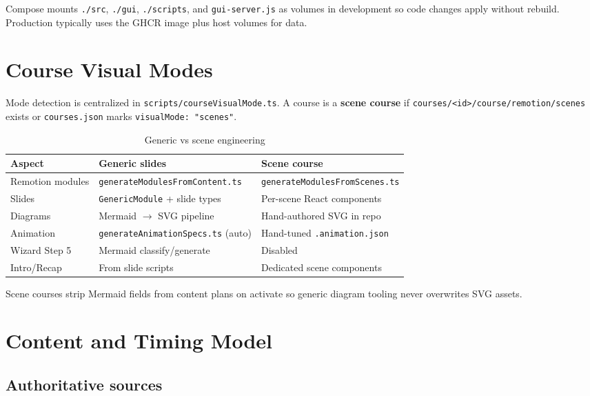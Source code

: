 \documentclass{scinexus}
\newcommand{\tableheadrow}[1]{\sffamily\bfseries\color{rbnavy} #1}
\begin{document}
Compose mounts \texttt{./src}, \texttt{./gui}, \texttt{./scripts}, and \texttt{gui-server.js} as volumes in development so code changes apply without rebuild. Production typically uses the GHCR image plus host volumes for data.

\section{Course Visual Modes}

Mode detection is centralized in \texttt{scripts/courseVisualMode.ts}. A course is a \textbf{scene course} if \texttt{courses/<id>/course/remotion/scenes} exists or \texttt{courses.json} marks \texttt{visualMode: "scenes"}.

\begin{table}[htbp]
	\centering
	\footnotesize
	\caption{Generic vs scene engineering}
	\begin{tabularx}{\textwidth}{@{}l L L@{}}
		\toprule
		\tableheadrow{Aspect} & \tableheadrow{Generic slides} & \tableheadrow{Scene course} \\
		\midrule
		Remotion modules & \texttt{generateModulesFromContent.ts} & \texttt{generateModulesFromScenes.ts} \\
		Slides & \texttt{GenericModule} + slide types & Per-scene React components \\
		Diagrams & Mermaid $\rightarrow$ SVG pipeline & Hand-authored SVG in repo \\
		Animation & \texttt{generateAnimationSpecs.ts} (auto) & Hand-tuned \texttt{.animation.json} \\
		Wizard Step 5 & Mermaid classify/generate & Disabled \\
		Intro/Recap & From slide scripts & Dedicated scene components \\
		\bottomrule
	\end{tabularx}
\end{table}

Scene courses strip Mermaid fields from content plans on activate so generic diagram tooling never overwrites SVG assets.

\section{Content and Timing Model}

\subsection{Authoritative sources}
\end{document}
